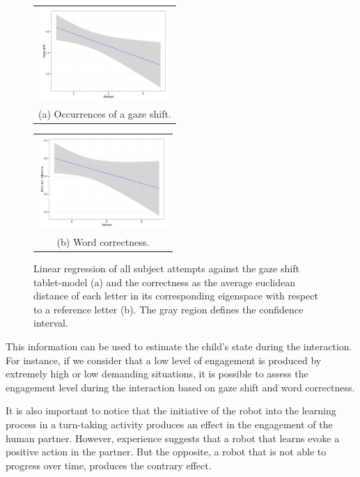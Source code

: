 \documentclass{sig-alternate}
\begin{document}
\begin{figure}
  \centering
  \begin{tabular}{@{}c@{}}
    \includegraphics[width=.7\linewidth,height=100pt]{gazeR} \\
    \small (a) Occurrences of a gaze shift.
  \end{tabular}\label{fig:gazeR}

  \vspace{\floatsep}

  \begin{tabular}{@{}c@{}}
    \includegraphics[width=.7\linewidth,height=100pt]{errorR} \\
    \small (b) Word correctness.
  \end{tabular}\label{fig:errorR}

  \caption{ \small Linear regression of all subject attempts against the gaze shift tablet-model (a) and the correctness as the average euclidean distance of each letter in its corresponding eigenspace with respect to a reference letter (b). The gray region defines the confidence interval.}
  
\end{figure}


This information can be used to estimate the child's state during the interaction. For instance, if we consider that a low level of engagement is produced by extremely high or low demanding situations, it is possible to assess the engagement level during the interaction based on gaze shift and word correctness.

It is also important to notice that the initiative of the robot into the learning process in a turn-taking activity produces an effect in the engagement of the human partner. However, experience suggests that a robot that learns evoke a positive action in the partner. But the opposite, a robot that is not able to progress over time, produces the contrary effect.
\end{document}
